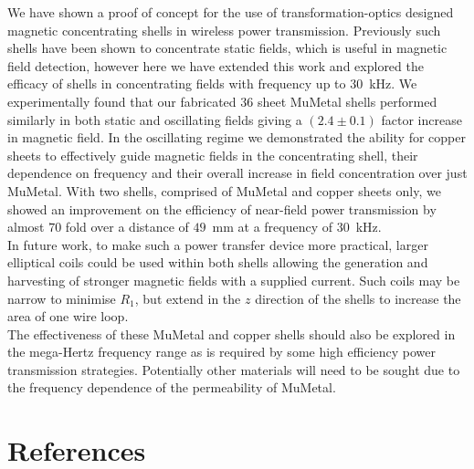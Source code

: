 \documentclass[11pt]{iopart}
\begin{document}
We have shown a proof of concept for the use of transformation-optics
designed magnetic concentrating shells in wireless power
transmission. Previously such shells have been shown to concentrate
static fields, which is useful in magnetic field detection, however here
we have extended this work and explored the efficacy of shells in
concentrating fields with frequency up to $30$~kHz. We experimentally
found that our fabricated $36$ sheet MuMetal shells performed
similarly in both static and oscillating fields giving a $(2.4\pm0.1)$
factor increase in magnetic field. In the oscillating regime we
demonstrated the ability for copper sheets to effectively guide magnetic
fields in the concentrating shell, their dependence on frequency and their
overall increase in field concentration over just MuMetal. With two
shells, comprised of MuMetal and copper sheets only, we showed an
improvement on the efficiency of near-field power transmission by
almost $70$ fold over a distance of $49$~mm at a frequency of
$30$~kHz.\\
In future work, to make such a power transfer device more practical,
larger elliptical coils could be used within both shells allowing the
generation and harvesting of stronger magnetic fields with a supplied
current. Such coils may be narrow to minimise $R_1$, but extend in the
$z$ direction of the shells to increase the area of one wire
loop.\\ The effectiveness of these MuMetal and copper shells should
also be explored in the mega-Hertz frequency range as is required by
some high efficiency power transmission
strategies\cite{Kurs2007}. Potentially other materials will need to be
sought due to the frequency dependence of the permeability of MuMetal.

\section{References}




\end{document}

